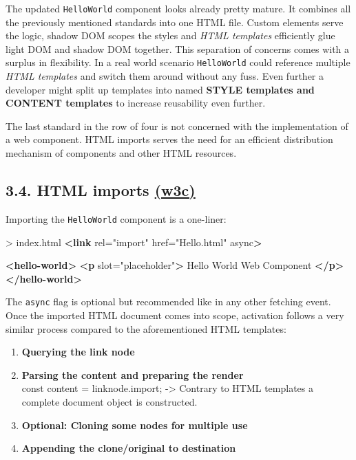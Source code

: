 \documentclass[]{article}
\newenvironment{Shaded}{}{}
\newcommand{\KeywordTok}[1]{\textcolor[rgb]{0.00,0.44,0.13}{\textbf{{#1}}}}
\newcommand{\StringTok}[1]{\textcolor[rgb]{0.25,0.44,0.63}{{#1}}}
\newcommand{\OtherTok}[1]{\textcolor[rgb]{0.00,0.44,0.13}{{#1}}}
\newcommand{\NormalTok}[1]{{#1}}
\begin{document}
The updated \texttt{HelloWorld} component looks already pretty mature.
It combines all the previously mentioned standards into one HTML file.
Custom elements serve the logic, shadow DOM scopes the styles and
\emph{HTML templates} efficiently glue light DOM and shadow DOM
together. This separation of concerns comes with a surplus in
flexibility. In a real world scenario \texttt{HelloWorld} could
reference multiple \emph{HTML templates} and switch them around without
any fuss. Even further a developer might split up templates into named
\textbf{STYLE templates and CONTENT templates} to increase reusability
even further.

The last standard in the row of four is not concerned with the
implementation of a web component. HTML imports serves the need for an
efficient distribution mechanism of components and other HTML resources.

\subsection{\texorpdfstring{3.4. HTML imports
\href{https://www.w3.org/TR/html-imports/}{(w3c)}}{3.4. HTML imports (w3c)}}\label{html-imports-w3c}

Importing the \texttt{HelloWorld} component is a one-liner:

\begin{Shaded}
\begin{Highlighting}[]
\NormalTok{> index.html}
\KeywordTok{<link}\OtherTok{ rel=}\StringTok{"import"}\OtherTok{ href=}\StringTok{"Hello.html"}\OtherTok{ async}\KeywordTok{>}

\KeywordTok{<hello-world>}
  \KeywordTok{<p}\OtherTok{ slot=}\StringTok{"placeholder"}\KeywordTok{>}
    \NormalTok{Hello World Web Component}
  \KeywordTok{</p>}
\KeywordTok{</hello-world>}
\end{Highlighting}
\end{Shaded}

The \texttt{async} flag is optional but recommended like in any other
fetching event. Once the imported HTML document comes into scope,
activation follows a very similar process compared to the aforementioned
HTML templates:

\begin{enumerate}
\def\labelenumi{\arabic{enumi}.}
\item
  \textbf{Querying the link node}
\item
  \textbf{Parsing the content and preparing the render}\\
  const content = linknode.import; -\textgreater{} Contrary to HTML
  templates a complete document object is constructed.
\item
  \textbf{Optional: Cloning some nodes for multiple use}
\item
  \textbf{Appending the clone/original to destination}
\end{enumerate}
\end{document}
